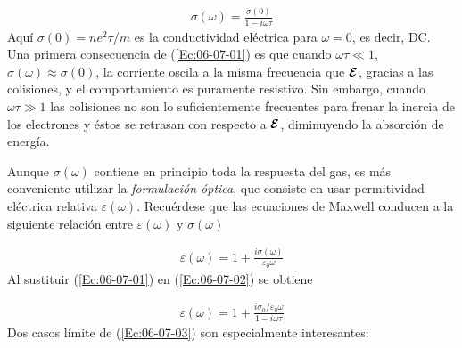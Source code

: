 \begin{eqnarray}
	\sigma (\omega) = \frac{\sigma(0)}{1-i \omega \tau} \label{Ec:06-07-01}
\end{eqnarray}
Aquí $\sigma (0) = ne^2 \tau/m$ es la conductividad eléctrica para $\omega=0$, es decir, DC. Una primera consecuencia de (\ref{Ec:06-07-01}) es que cuando $\omega \tau \ll 1$, $\sigma (\omega) \approx \sigma (0)$, la corriente oscila a la misma frecuencia que $\boldsymbol{\mathcal{E}}$, gracias a las colisiones, y el comportamiento es puramente resistivo. Sin embargo, cuando $\omega \tau \gg 1$ las colisiones no son lo suficientemente frecuentes para frenar la inercia de los electrones y éstos se retrasan con respecto a $\boldsymbol{\mathcal{E}}$, diminuyendo la absorción de energía.

Aunque $\sigma (\omega)$ contiene en principio toda la respuesta del gas, es más conveniente utilizar la \textit{formulación óptica}, que consiste en usar permitividad eléctrica relativa $\varepsilon(\omega)$. Recuérdese que las ecuaciones de Maxwell conducen a la siguiente relación entre $\varepsilon (\omega)$ y $\sigma (\omega)$ 

\begin{eqnarray}
	\varepsilon (\omega) = 1 + \frac{i \sigma(\omega)}{\varepsilon_0 \omega} \label{Ec:06-07-02}
\end{eqnarray}
Al sustituir (\ref{Ec:06-07-01}) en (\ref{Ec:06-07-02}) se obtiene 

\begin{eqnarray}
	\varepsilon(\omega) = 1 + \frac{i \sigma_0 / \varepsilon_0 \omega}{1-i\omega \tau} \label{Ec:06-07-03}
\end{eqnarray}
Dos casos límite de (\ref{Ec:06-07-03}) son especialmente interesantes:


